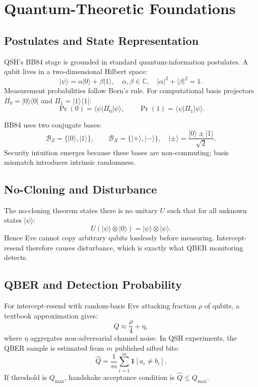 \documentclass[11pt,a4paper]{article}
\begin{document}
\section{Quantum-Theoretic Foundations}
\subsection{Postulates and State Representation}
QSH's BB84 stage is grounded in standard quantum-information postulates. A qubit lives in a two-dimensional Hilbert space:
\[
\lvert \psi \rangle = \alpha \lvert 0 \rangle + \beta \lvert 1 \rangle,\quad \alpha,\beta \in \mathbb{C},\quad |\alpha|^2 + |\beta|^2 = 1.
\]
Measurement probabilities follow Born's rule. For computational basis projectors $\Pi_0=\lvert0\rangle\langle0\rvert$ and $\Pi_1=\lvert1\rangle\langle1\rvert$:
\[
\Pr(0)=\langle\psi|\Pi_0|\psi\rangle,\qquad \Pr(1)=\langle\psi|\Pi_1|\psi\rangle.
\]

BB84 uses two conjugate bases:
\[
\mathcal{B}_Z=\{\lvert0\rangle,\lvert1\rangle\},\qquad
\mathcal{B}_X=\{\lvert+\rangle,\lvert-\rangle\},\quad
\lvert\pm\rangle=\frac{\lvert0\rangle\pm\lvert1\rangle}{\sqrt{2}}.
\]
Security intuition emerges because these bases are non-commuting; basis mismatch introduces intrinsic randomness.

\subsection{No-Cloning and Disturbance}
The no-cloning theorem states there is no unitary $U$ such that for all unknown states $\lvert\psi\rangle$:
\[
U(\lvert\psi\rangle\otimes\lvert0\rangle)=\lvert\psi\rangle\otimes\lvert\psi\rangle.
\]
Hence Eve cannot copy arbitrary qubits losslessly before measuring. Intercept-resend therefore causes disturbance, which is exactly what QBER monitoring detects.

\subsection{QBER and Detection Probability}
For intercept-resend with random-basis Eve attacking fraction $\rho$ of qubits, a textbook approximation gives:
\[
Q \approx \frac{\rho}{4} + \eta,
\]
where $\eta$ aggregates non-adversarial channel noise. In QSH experiments, the QBER sample is estimated from $m$ published sifted bits:
\[
\widehat{Q} = \frac{1}{m}\sum_{i=1}^{m}\mathbf{1}[a_i \neq b_i].
\]
If threshold is $Q_{\max}$, handshake acceptance condition is $\widehat{Q}\le Q_{\max}$.
\end{document}
